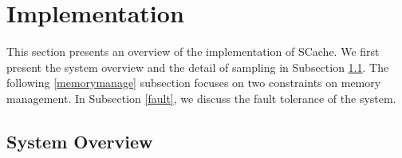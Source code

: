 \section{Implementation}\label{impl}
This section presents an overview of the implementation of SCache. 
We first present the system overview and the detail of sampling in Subsection \ref{arch}. 
The following \ref{memorymanage} subsection focuses on two constraints on memory management.
{\color{black}
In Subsection \ref{fault}, we discuss the fault tolerance of the system.
}


\subsection{System Overview}\label{arch}
